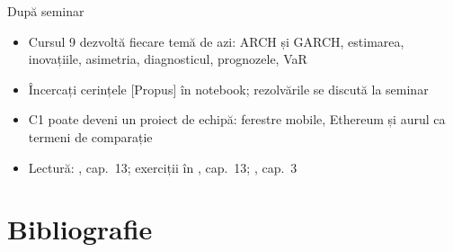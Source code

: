 \begin{frame}{După seminar}
\itemsize{\small}
\begin{itemize}
    \item Cursul 9 dezvoltă fiecare temă de azi: ARCH și GARCH, estimarea, inovațiile, asimetria, diagnosticul, prognozele, VaR
    \item Încercați cerințele [Propus] în notebook; rezolvările se discută la seminar
    \item C1 poate deveni un proiect de echipă: ferestre mobile, Ethereum și aurul ca termeni de comparație
    \item Lectură: , cap.~13; exerciții în , cap.~13; , cap.~3
\end{itemize}
\end{frame}


\section{Bibliografie}

